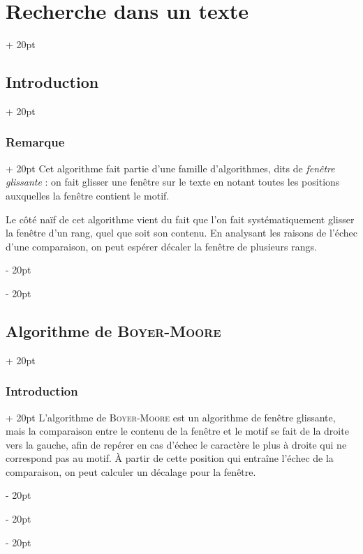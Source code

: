 \documentclass[a4paper, 12pt, twoside]{article}
\newcommand{\ind}[1][20pt]{\advance\leftskip + #1}
\newcommand{\deind}[1][20pt]{\advance\leftskip - #1}
\newenvironment{indt}[2][20pt]{#2 \par \ind[#1]}{\par \deind} %
\begin{document}
\begin{indt}{\section{Recherche dans un texte}}
\begin{indt}{\subsection{Introduction}}
            \vspace{12pt}
            
            \begin{indt}{\subsubsection{Remarque}}
                Cet algorithme fait partie d'une famille d'algorithmes, dits de \textit{fenêtre glissante} : on fait glisser une fenêtre sur le texte en notant toutes les positions auxquelles la fenêtre contient le motif.

                \begin{center}
                \end{center}

                Le côté naïf de cet algorithme vient du fait que l'on fait systématiquement glisser la fenêtre d'un rang, quel que soit son contenu. En analysant les raisons de l'échec d'une comparaison, on peut espérer décaler la fenêtre de plusieurs rangs.
            \end{indt}
        \end{indt}

        \vspace{12pt}
        
        \begin{indt}{\subsection{Algorithme de \textsc{Boyer-Moore}}}
            \begin{indt}{\subsubsection{Introduction}}
                L'algorithme de \textsc{Boyer-Moore} est un algorithme de fenêtre glissante, mais la comparaison entre le contenu de la fenêtre et le motif se fait de la droite vers la gauche, afin de repérer en cas d'échec le caractère le plus à droite qui ne correspond pas au motif. \`A partir de cette position qui entraîne l'échec de la comparaison, on peut calculer un décalage pour la fenêtre.


\end{indt}
\end{indt}
\end{indt}
\end{document}
